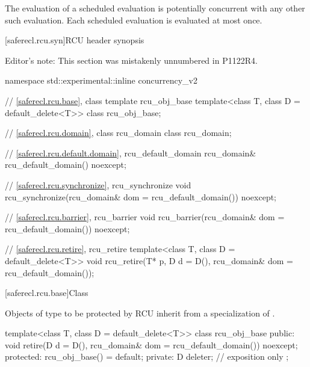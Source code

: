 \pnum
The evaluation of a scheduled evaluation is potentially concurrent with
any other such evaluation. Each scheduled evaluation is evaluated at
most once.

[saferecl.rcu.syn]{RCU header  synopsis}

Editor's note: This section was mistakenly unnumbered in P1122R4.


\begin{codeblock}
namespace std::experimental::inline concurrency_v2 {
  // \ref{saferecl.rcu.base}, class template rcu_obj_base
  template<class T, class D = default_delete<T>>
    class rcu_obj_base;

  // \ref{saferecl.rcu.domain}, class rcu_domain
  class rcu_domain;

  // \ref{saferecl.rcu.default.domain}, rcu_default_domain
  rcu_domain& rcu_default_domain() noexcept;

  // \ref{saferecl.rcu.synchronize}, rcu_synchronize
  void rcu_synchronize(rcu_domain& dom = rcu_default_domain()) noexcept;

  // \ref{saferecl.rcu.barrier}, rcu_barrier
  void rcu_barrier(rcu_domain& dom = rcu_default_domain()) noexcept;

  // \ref{saferecl.rcu.retire}, rcu_retire
  template<class T, class D = default_delete<T>>
    void rcu_retire(T* p, D d = D(), rcu_domain& dom = rcu_default_domain());
}
\end{codeblock}

[saferecl.rcu.base]{Class }


Objects of type  to be protected by RCU inherit from a
specialization of .


\begin{codeblock}
template<class T, class D = default_delete<T>>
class rcu_obj_base {
public:
  void retire(D d = D(), rcu_domain& dom = rcu_default_domain()) noexcept;
protected:
  rcu_obj_base() = default;
private:
  D deleter;  // exposition only
};
\end{codeblock}

